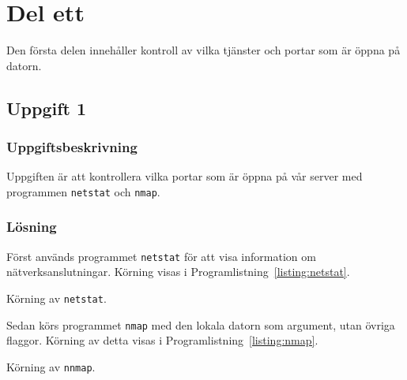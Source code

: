 %
%
%


\section{Del ett}
Den första delen innehåller kontroll av vilka tjänster och portar som är öppna
på datorn.


\subsection{Uppgift 1}
\subsubsection{Uppgiftsbeskrivning}
Uppgiften är att kontrollera vilka portar som är öppna på vår server med
programmen \texttt{netstat} och \texttt{nmap}.  


\subsubsection{Lösning}
Först används programmet \texttt{netstat} för att visa information om
nätverksanslutningar. Körning visas i Programlistning~\ref{listing:netstat}.


\begin{listing}[H]
  \caption{Körning av \texttt{netstat}.}
  \label{listing:netstat}
\end{listing}


Sedan körs programmet \texttt{nmap} med den lokala datorn som argument, utan
övriga flaggor. Körning av detta visas i Programlistning~\ref{listing:nmap}.

\begin{listing}[H]
  \caption{Körning av \texttt{nnmap}.}
  \label{listing:nnmap}
\end{listing}
